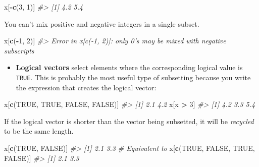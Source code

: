 \documentclass[]{book}
\newenvironment{Shaded}{\begin{snugshade}}{\end{snugshade}}
\newcommand{\KeywordTok}[1]{\textcolor[rgb]{0.13,0.29,0.53}{\textbf{#1}}}
\newcommand{\DecValTok}[1]{\textcolor[rgb]{0.00,0.00,0.81}{#1}}
\newcommand{\StringTok}[1]{\textcolor[rgb]{0.31,0.60,0.02}{#1}}
\newcommand{\CommentTok}[1]{\textcolor[rgb]{0.56,0.35,0.01}{\textit{#1}}}
\newcommand{\OtherTok}[1]{\textcolor[rgb]{0.56,0.35,0.01}{#1}}
\newcommand{\OperatorTok}[1]{\textcolor[rgb]{0.81,0.36,0.00}{\textbf{#1}}}
\newcommand{\NormalTok}[1]{#1}
\providecommand{\tightlist}{%
  \setlength{\itemsep}{0pt}\setlength{\parskip}{0pt}}
\theoremstyle{definition}
\theoremstyle{definition}
\theoremstyle{definition}
\theoremstyle{remark}
\begin{document}
\begin{Shaded}
\begin{Highlighting}[]
\NormalTok{x[}\OperatorTok{-}\KeywordTok{c}\NormalTok{(}\DecValTok{3}\NormalTok{, }\DecValTok{1}\NormalTok{)]}
\CommentTok{#> [1] 4.2 5.4}
\end{Highlighting}
\end{Shaded}

You can't mix positive and negative integers in a single subset.

\begin{Shaded}
\begin{Highlighting}[]
\NormalTok{x[}\KeywordTok{c}\NormalTok{(}\OperatorTok{-}\DecValTok{1}\NormalTok{, }\DecValTok{2}\NormalTok{)]}
\CommentTok{#> Error in x[c(-1, 2)]: only 0's may be mixed with negative subscripts}
\end{Highlighting}
\end{Shaded}

\begin{itemize}
\tightlist
\item
  \textbf{Logical vectors} select elements where the corresponding
  logical value is \texttt{TRUE}. This is probably the most useful type
  of subsetting because you write the expression that creates the
  logical vector:
\end{itemize}

\begin{Shaded}
\begin{Highlighting}[]
\NormalTok{x[}\KeywordTok{c}\NormalTok{(}\OtherTok{TRUE}\NormalTok{, }\OtherTok{TRUE}\NormalTok{, }\OtherTok{FALSE}\NormalTok{, }\OtherTok{FALSE}\NormalTok{)]}
\CommentTok{#> [1] 2.1 4.2}
\NormalTok{x[x }\OperatorTok{>}\StringTok{ }\DecValTok{3}\NormalTok{]}
\CommentTok{#> [1] 4.2 3.3 5.4}
\end{Highlighting}
\end{Shaded}

If the logical vector is shorter than the vector being subsetted, it
will be \emph{recycled} to be the same length.

\begin{Shaded}
\begin{Highlighting}[]
\NormalTok{x[}\KeywordTok{c}\NormalTok{(}\OtherTok{TRUE}\NormalTok{, }\OtherTok{FALSE}\NormalTok{)]}
\CommentTok{#> [1] 2.1 3.3}
\CommentTok{# Equivalent to}
\NormalTok{x[}\KeywordTok{c}\NormalTok{(}\OtherTok{TRUE}\NormalTok{, }\OtherTok{FALSE}\NormalTok{, }\OtherTok{TRUE}\NormalTok{, }\OtherTok{FALSE}\NormalTok{)]}
\CommentTok{#> [1] 2.1 3.3}
\end{Highlighting}
\end{Shaded}
\end{document}
